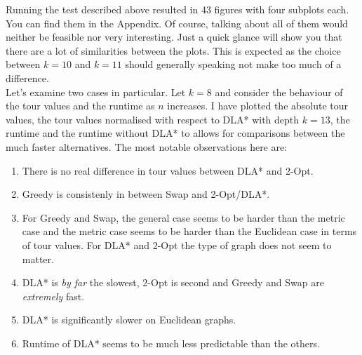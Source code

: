 \documentclass{article}
\begin{document}
Running the test described above resulted in 43 figures with four subplots
each. You can find them in the Appendix. Of course, talking about all of them
would neither be feasible nor very interesting. Just a quick glance will show
you that there are a lot of similarities between the plots. This is expected
as the choice between $k=10$ and $k=11$ should generally speaking not make too
much of a difference.\\
Let's examine two cases in particular.
Let $k=8$ and consider the behaviour of
the tour values and the runtime as $n$ increases.
I have plotted the absolute tour values, the tour values normalised with
respect to DLA* with depth $k=13$, the runtime and the runtime without
DLA* to allows for comparisons between the much faster alternatives.
The most notable observations here are:
\begin{enumerate}
	\item There is no real difference in tour values between DLA* and 2-Opt.
	\item Greedy is consistenly in between Swap and 2-Opt/DLA*.
	\item For Greedy and Swap, the general case seems to be harder than the
	      metric case and the metric case seems to be harder than the Euclidean case
	      in terms of tour values. For DLA* and 2-Opt the type of graph does not
	      seem to matter.
	\item DLA* is \emph{by far} the slowest, 2-Opt is second and Greedy and
	      Swap are \emph{extremely} fast.
	\item DLA* is significantly slower on Euclidean graphs.
	\item Runtime of DLA* seems to be much less predictable than the others.
\end{enumerate}
\end{document}

